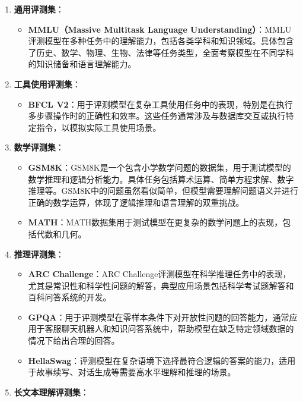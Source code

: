 \documentclass[12pt,a4paper]{book}
\begin{document}
\begin{enumerate}
\def\labelenumi{\arabic{enumi}.}
\tightlist
\item
  \textbf{通用评测集}：

  \begin{itemize}
  \tightlist
  \item
    \textbf{MMLU（Massive Multitask Language
    Understanding）}：MMLU评测模型在多种任务中的理解能力，包括各类学科和知识领域。具体包含了历史、数学、物理、生物、法律等任务类型，全面考察模型在不同学科的知识储备和语言理解能力。
  \end{itemize}
\item
  \textbf{工具使用评测集}：

  \begin{itemize}
  \tightlist
  \item
    \textbf{BFCL
    V2}：用于评测模型在复杂工具使用任务中的表现，特别是在执行多步骤操作时的正确性和效率。这些任务通常涉及与数据库交互或执行特定指令，以模拟实际工具使用场景。
  \end{itemize}
\item
  \textbf{数学评测集}：

  \begin{itemize}
  \tightlist
  \item
    \textbf{GSM8K}：GSM8K是一个包含小学数学问题的数据集，用于测试模型的数学推理和逻辑分析能力。具体任务包括算术运算、简单方程求解、数字推理等。GSM8K中的问题虽然看似简单，但模型需要理解问题语义并进行正确的数学运算，体现了逻辑推理和语言理解的双重挑战。
  \item
    \textbf{MATH}：MATH数据集用于测试模型在更复杂的数学问题上的表现，包括代数和几何。
  \end{itemize}
\item
  \textbf{推理评测集}：

  \begin{itemize}
  \tightlist
  \item
    \textbf{ARC Challenge}：ARC
    Challenge评测模型在科学推理任务中的表现，尤其是常识性和科学性问题的解答，典型应用场景包括科学考试题解答和百科问答系统的开发。
  \item
    \textbf{GPQA}：用于评测模型在零样本条件下对开放性问题的回答能力，通常应用于客服聊天机器人和知识问答系统中，帮助模型在缺乏特定领域数据的情况下给出合理的回答。
  \item
    \textbf{HellaSwag}：评测模型在复杂语境下选择最符合逻辑的答案的能力，适用于故事续写、对话生成等需要高水平理解和推理的场景。
  \end{itemize}
\item
  \textbf{长文本理解评测集}：


\end{enumerate}
\end{document}
